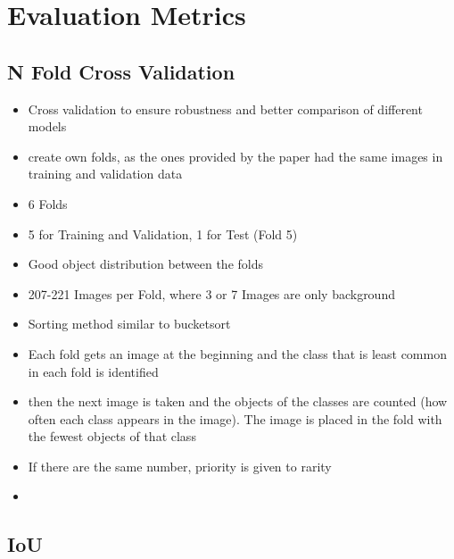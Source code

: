 \section{Evaluation Metrics}
\subsection{N Fold Cross Validation}
\begin{itemize}
    \item Cross validation to ensure robustness and better comparison of different models
    \item create own folds, as the ones provided by the paper had the same images in training and validation data
    \item  6 Folds
    \item 5 for Training and Validation, 1 for Test (Fold 5)
    \item Good object distribution between the folds
    \item 207-221 Images per Fold, where 3 or 7 Images are only background
    
    \item Sorting method similar to bucketsort
    \item Each fold gets an image at the beginning and the class that is least common in each fold is identified
    \item then the next image is taken and the objects of the classes are counted (how often each class appears in the image). The image is placed in the fold with the fewest objects of that class
    \item If there are the same number, priority is given to rarity
    \item {}


\end{itemize}

\subsection{IoU}

